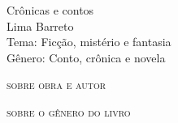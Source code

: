 \documentclass[smaller,professionalfonts,15pt]{beamer}
\begin{document}
										\begin{frame}\begin{raggedleft}
										\Huge 
Crônicas e contos						\\
										\huge 
Lima Barreto							\\
										\bigskip
										\normalsize
Tema: Ficção, mistério e fantasia		\\	
Gênero: Conto, crônica e novela			\\\vfill\hfill
\publishername
										\end{raggedleft}

\end{frame}


\begin{frame}
\begin{figure}
\hfill{}
\end{figure}
\end{frame}


\begin{frame}
\hfill\Huge
\textsc{sobre obra e autor}
\end{frame}

\begin{frame}
\hfill\Huge
\textsc{sobre o gênero do livro}
\end{frame}
\end{document}
